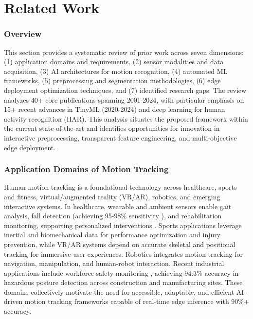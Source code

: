 \chapter{Related Work}
\label{chap:relatedwork}

\subsection{Overview}
This section provides a systematic review of prior work across seven dimensions: (1) application domains and requirements, (2) sensor modalities and data acquisition, (3) AI architectures for motion recognition, (4) automated ML frameworks, (5) preprocessing and segmentation methodologies, (6) edge deployment optimization techniques, and (7) identified research gaps. The review analyzes 40+ core publications spanning 2001-2024, with particular emphasis on 15+ recent advances in TinyML (2020-2024) and deep learning for human activity recognition (HAR). This analysis situates the proposed framework within the current state-of-the-art and identifies opportunities for innovation in interactive preprocessing, transparent feature engineering, and multi-objective edge deployment.

\subsection{Application Domains of Motion Tracking}
Human motion tracking is a foundational technology across healthcare, sports and fitness, virtual/augmented reality (VR/AR), robotics, and emerging interactive systems. In healthcare, wearable and ambient sensors enable gait analysis, fall detection (achieving 95-98\% sensitivity \cite{wan2021deep_har_review}), and rehabilitation monitoring, supporting personalized interventions \cite{article:human_motion_tracking_survey}. Sports applications leverage inertial and biomechanical data for performance optimization and injury prevention, while VR/AR systems depend on accurate skeletal and positional tracking for immersive user experiences. Robotics integrates motion tracking for navigation, manipulation, and human-robot interaction. Recent industrial applications include workforce safety monitoring \cite{wang2023har_industrial}, achieving 94.3\% accuracy in hazardous posture detection across construction and manufacturing sites. These domains collectively motivate the need for accessible, adaptable, and efficient AI-driven motion tracking frameworks capable of real-time edge inference with 90\%+ accuracy.

